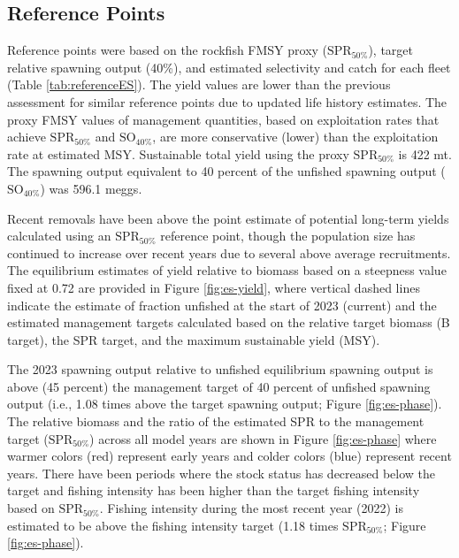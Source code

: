 \documentclass[11pt,
  letterpaper,
]{article}
\begin{document}
\hypertarget{reference-points}{%
\subsection*{Reference Points}\label{reference-points}}

Reference points were based on the rockfish FMSY proxy (\(\text{SPR}_{50\%}\)), target relative spawning output (40\%), and estimated selectivity and catch for each fleet (Table \ref{tab:referenceES}). The yield values are lower than the previous assessment for similar reference points due to updated life history estimates. The proxy FMSY values of management quantities, based on exploitation rates that achieve \(\text{SPR}_{50\%}\) and \(\text{SO}_{40\%}\), are more conservative (lower) than the exploitation rate at estimated MSY. Sustainable total yield using the proxy \(\text{SPR}_{50\%}\) is 422 mt. The spawning output equivalent to 40 percent of the unfished spawning output (\(\text{SO}_{40\%}\)) was 596.1 meggs.

Recent removals have been above the point estimate of potential long-term yields calculated using an \(\text{SPR}_{50\%}\) reference point, though the population size has continued to increase over recent years due to several above average recruitments. The equilibrium estimates of yield relative to biomass based on a steepness value fixed at 0.72 are provided in Figure \ref{fig:es-yield}, where vertical dashed lines indicate the estimate of fraction unfished at the start of 2023 (current) and the estimated management targets calculated based on the relative target biomass (B target), the SPR target, and the maximum sustainable yield (MSY).

The 2023 spawning output relative to unfished equilibrium spawning output is above (45 percent) the management target of 40 percent of unfished spawning output (i.e., 1.08 times above the target spawning output; Figure \ref{fig:es-phase}). The relative biomass and the ratio of the estimated SPR to the management target (\(\text{SPR}_{50\%}\)) across all model years are shown in Figure \ref{fig:es-phase} where warmer colors (red) represent early years and colder colors (blue) represent recent years. There have been periods where the stock status has decreased below the target and fishing intensity has been higher than the target fishing intensity based on \(\text{SPR}_{50\%}\). Fishing intensity during the most recent year (2022) is estimated to be above the fishing intensity target (1.18 times \(\text{SPR}_{50\%}\); Figure \ref{fig:es-phase}).
\end{document}
